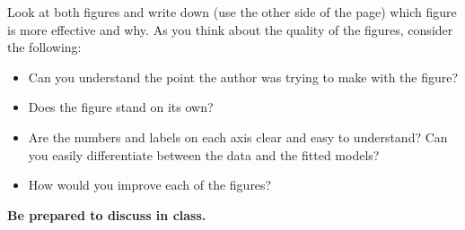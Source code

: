 \documentclass[11pt,letterpaper]{article}
\begin{document}
\vspace{0.5cm}

Look at both figures and write down (use the other side of the page) which figure is more effective and why. As you think about the quality of the figures, consider the following: 
\begin{itemize}
\item Can you understand the point the author was trying to make with the figure? \item Does the figure stand on its own?  
\item Are the numbers and labels on each axis clear and easy to understand?  Can you easily differentiate between the data and the fitted models? 
\item How would you improve each of the figures?
\end{itemize}
\textbf{Be prepared to discuss in class.}
\end{document}
